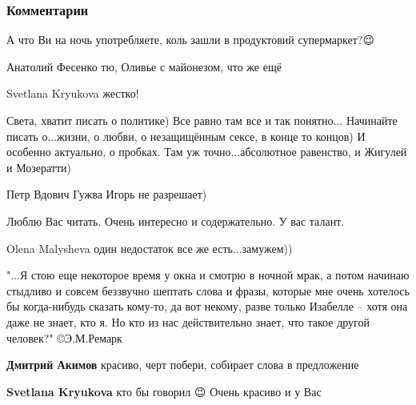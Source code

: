  
 
 
 
 
\subsubsection{Комментарии}
\label{sec:30_06_2021.fb.krjukova_svetlana.1.supermarket_chelovek.cmt}

\begin{itemize}
А что Ви на ночь употребляете, коль зашли в продуктовий супермаркет?😉


Анатолий Фесенко тю, Оливье с майонезом, что же ещё

Svetlana Kryukova жестко!

Света, хватит писать о политике) Все равно там все и так понятно...
Начинайте писать о...жизни, о любви, о незащищённым сексе, в конце то концов) И особенно актуально, о пробках. Там уж точно...абсолютное равенство, и Жигулей и Мозератти)🙂

Петр Вдович Гужва Игорь не разрешает)

Люблю Вас читать. Очень интересно и содержательно. У вас талант.

Olena Malysheva один недостаток все же есть...замужем))

"...Я стою еще некоторое время у окна и смотрю в ночной мрак, а потом начинаю стыдливо и совсем беззвучно шептать слова и фразы, которые мне очень хотелось бы когда-нибудь сказать кому-то, да вот некому, разве только Изабелле – хотя она даже не знает, кто я. Но кто из нас действительно знает, что такое другой человек?" ©Э.М.Ремарк

\textbf{Дмитрий Акимов} красиво, черт побери, собирает слова в предложение

\textbf{Svetlana Kryukova} кто бы говорил 😉 Очень красиво и у Вас


\end{itemize}
